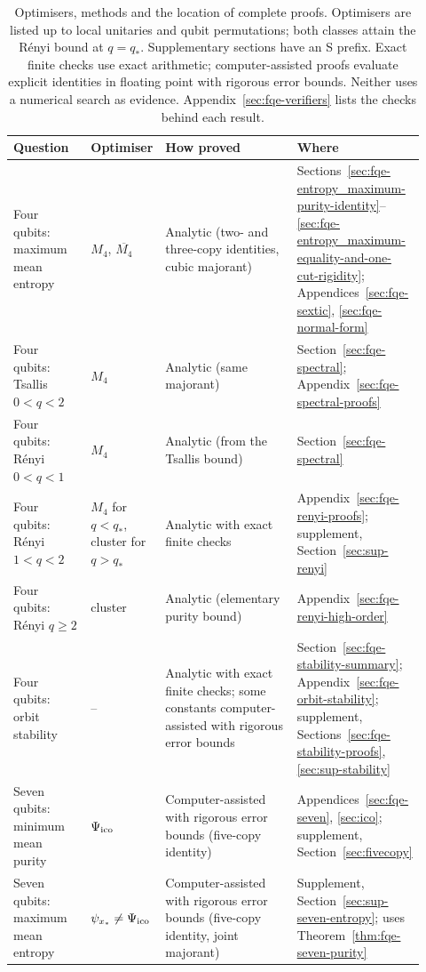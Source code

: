 \documentclass[11pt]{article}
\begin{document}
\begin{table}[htbp]
\centering\small
\begin{tabular}{@{}p{0.19\linewidth}p{0.17\linewidth}p{0.33\linewidth}p{0.23\linewidth}@{}}
\toprule
Question & Optimiser & How proved & Where \\
\midrule
Four qubits: maximum mean entropy & $M_4$, $\overline{M_4}$ &
Analytic (two- and three-copy identities, cubic majorant) &
Sections~\ref{sec:fqe-entropy_maximum-purity-identity}--\ref{sec:fqe-entropy_maximum-equality-and-one-cut-rigidity};
Appendices~\ref{sec:fqe-sextic}, \ref{sec:fqe-normal-form} \\\addlinespace
Four qubits: Tsallis $0<q<2$ & $M_4$ & Analytic (same majorant) &
Section~\ref{sec:fqe-spectral}; Appendix~\ref{sec:fqe-spectral-proofs} \\\addlinespace
Four qubits: R\'enyi $0<q<1$ & $M_4$ & Analytic (from the Tsallis bound) &
Section~\ref{sec:fqe-spectral} \\\addlinespace
Four qubits: R\'enyi $1<q<2$ & $M_4$ for $q<q_*$, cluster for $q>q_*$ &
Analytic with exact finite checks &
Appendix~\ref{sec:fqe-renyi-proofs}; supplement, Section~\ref{sec:sup-renyi} \\\addlinespace
Four qubits: R\'enyi $q\ge2$ & cluster & Analytic (elementary purity bound) &
Appendix~\ref{sec:fqe-renyi-high-order} \\\addlinespace
Four qubits: orbit stability & -- & Analytic with exact finite checks; some constants computer-assisted with rigorous error bounds &
Section~\ref{sec:fqe-stability-summary}; Appendix~\ref{sec:fqe-orbit-stability}; supplement, Sections~\ref{sec:fqe-stability-proofs}, \ref{sec:sup-stability} \\\addlinespace
Seven qubits: minimum mean purity & $\Psi_{\mathrm{ico}}$ & Computer-assisted with rigorous error bounds (five-copy identity) &
Appendices~\ref{sec:fqe-seven}, \ref{sec:ico}; supplement, Section~\ref{sec:fivecopy} \\\addlinespace
Seven qubits: maximum mean entropy & $\psi_{x_*}\ne\Psi_{\mathrm{ico}}$ & Computer-assisted with rigorous error bounds (five-copy identity, joint majorant) &
Supplement, Section~\ref{sec:sup-seven-entropy}; uses Theorem~\ref{thm:fqe-seven-purity} \\
\bottomrule
\end{tabular}
\caption{Optimisers, methods and the location of complete proofs. Optimisers are listed up to local unitaries and qubit
permutations; both classes attain the R\'enyi bound at $q=q_*$. Supplementary sections have an S prefix. Exact finite checks use exact arithmetic; computer-assisted
proofs evaluate explicit identities in floating point with rigorous error bounds. Neither uses a numerical search as
evidence. Appendix~\ref{sec:fqe-verifiers} lists the checks behind each result.}
\label{tab:fqe-guide}\label{tab:fqe-proof-guide}
\end{table}
\end{document}
